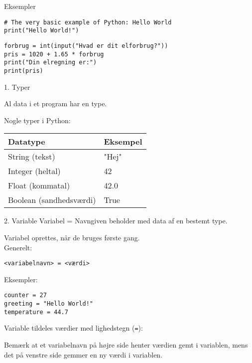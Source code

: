 \documentclass[10pt]{beamer}
\begin{document}

\begin{frame}[fragile]{Eksempler}
	\begin{lstlisting}[style=python]
# The very basic example of Python: Hello World
print("Hello World!")
	\end{lstlisting}
	\medskip
	\begin{lstlisting}[style=python]
forbrug = int(input("Hvad er dit elforbrug?"))
pris = 1020 + 1.65 * forbrug
print("Din elregning er:")
print(pris)
	\end{lstlisting}
\end{frame}


\begin{frame}{1. Typer}

Al data i et program har en \alert{type}.

\medskip
Nogle typer i Python:
\medskip

\begin{center}
	\begin{tabular}{ll}
		\hline
		Datatype						&		Eksempel 	\\ \hline \hline
		String (tekst)					&		"Hej"		\\
		Integer (heltal)				&		42			\\
		Float (kommatal)				&		42.0		\\
		Boolean	(sandhedsværdi)			&		True		\\
	\end{tabular}
\end{center}
\end{frame}


\begin{frame}[fragile]{2. Variable}
Variabel = Navngiven beholder med data af en bestemt type.

\medskip
Variabel oprettes, når de bruges første gang.\\
Generelt:
\begin{lstlisting}[style=python]
<variabelnavn> = <værdi>
\end{lstlisting}

Eksempler:
\begin{lstlisting}[style=python]
counter = 27
greeting = "Hello World!"
temperature = 44.7
\end{lstlisting}


Variable tildeles værdier med lighedstegn (\texttt{=}):

Bemærk at et variabelnavn på \alert{højre} side henter værdien gemt i
variablen, mens det på \alert{venstre} side gemmer en ny værdi i variablen.

\end{frame}
\end{document}
